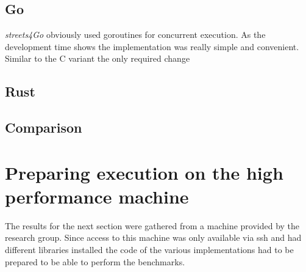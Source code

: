 \subsection{Go}
\label{subsec:Implementation::ParallelBenchmark::Go}

\textit{streets4Go} obviously used goroutines for concurrent execution. As the development time shows the implementation was really simple and convenient. Similar to the C variant the only required change

\subsection{Rust}
\label{subsec:Implementation::ParallelBenchmark::Rust}


\subsection{Comparison}
\label{subsec:Implementation::ParallelBenchmark::Comparison}

\section{Preparing execution on the high performance machine}
\label{sec:Implementation::ClusterPreparation}

The results for the next section were gathered from a machine provided by the research group. Since access to this machine was only available via \gls{ssh} and had different libraries installed the code of the various implementations had to be prepared to be able to perform the benchmarks.
